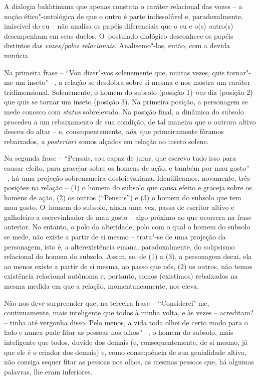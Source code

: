 {A dialogia bakhtiniana que apenas constata o caráter relacional das
vozes -- a noção ético"-ontológica de que o outro é parte indissolúvel e,
paradoxalmente, imiscível do eu -- não analisa os papéis diferenciais
que o eu e o(s) outro(s) desempenham em seus duelos. O~postulado
dialógico desconhece os papéis distintos das \emph{vozes/polos
relacionais.} Analisemo"-los, então, com a devida minúcia.

Na primeira frase -- ``Vou dizer"-vos solenemente que, muitas vezes, quis
tornar"-me um inseto'' --, a relação se desdobra sobre si mesma e nos
mostra um caráter tridimensional. Solenemente, o homem do subsolo
(posição 1) \emph{nos} diz (posição 2) que quis se tornar um inseto
(posição 3). Na primeira posição, a personagem se mede conosco com
\emph{status} sobrelevado. Na posição final, a dinâmica do subsolo
procedeu a um rebaixamento de sua condição, de tal maneira que o outrora
altivo desceu do altar -- e, consequentemente, \emph{nós}, que
primeiramente fôramos rebaixados, \emph{a posteriori} somos alçados em
relação ao inseto solene.

Na segunda frase -- ``Pensais, sou capaz de jurar, que escrevo tudo isso
para causar efeito, para gracejar sobre os homens de ação, e também por
mau gosto'' --, há uma projeção sobremaneira dostoievskiana.
Identificamos, novamente, três posições na relação -- (1) o homem do
subsolo que causa efeito e graceja sobre os homens de ação, (2) os
outros (``Pensais'') e (3) o homem do subsolo que tem mau gosto. O~homem
do subsolo, ainda uma vez, passa de escritor altivo e galhofeiro a
escrevinhador de mau gosto -- algo próximo ao que ocorrera na frase
anterior. No entanto, o polo da alteridade, polo com o qual o homem do
subsolo se mede, não existe a partir de si mesmo -- trata"-se de uma
projeção da personagem, isto é, a alterexistência emana, paradoxalmente,
do solipsismo relacional do homem do subsolo. Assim, se, de (1) a (3), a
personagem decai, ela ao menos existe a partir de si mesma, ao passo que
nós, (2) os outros, não temos existência relacional autônoma e,
portanto, somos (existimos) rebaixados na mesma medida em que a relação,
momentaneamente, nos eleva.

Não nos deve surpreender que, na terceira frase -- ``Considerei"-me,
continuamente, mais inteligente que todos à minha volta, e às vezes --
acreditam? -- tinha até vergonha disso. Pelo menos, a vida toda olhei de
certo modo para o lado e nunca pude fitar as pessoas nos olhos'' --, o
homem do subsolo, mais inteligente que todos, duvide dos demais (e,
consequentemente, de si mesmo, já que ele é o criador dos demais) e,
como consequência de sua genialidade altiva, não consiga sequer fitar as
pessoas nos olhos, as mesmas pessoas que, há algumas palavras, lhe eram
inferiores.

}
